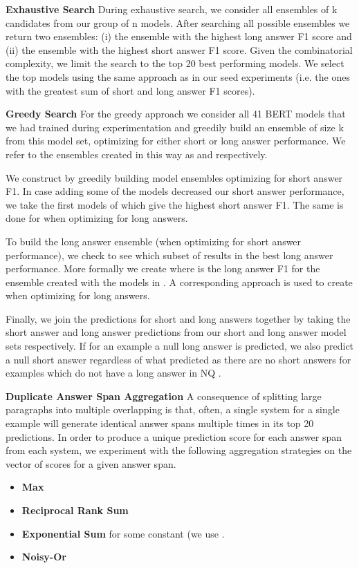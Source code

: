 \documentclass[letterpaper]{article} \usepackage{aaai20}  \usepackage{times}  \usepackage{helvet} \usepackage{courier}  \usepackage[hyphens]{url}  \usepackage{graphicx} \urlstyle{rm} \def\UrlFont{\rm}  \usepackage{graphicx}  \frenchspacing  \setlength{\pdfpagewidth}{8.5in}  \setlength{\pdfpageheight}{11in}  \usepackage{amsmath}
\newcommand{\bertlarge}{BERT}
\begin{document}
\textbf{Exhaustive Search}
During exhaustive search, we consider all  ensembles of k candidates from our group of n models. After searching all possible ensembles we return two ensembles: (i) the ensemble with the highest long answer F1 score and (ii) the ensemble with the highest short answer F1 score. Given the combinatorial complexity, we limit the search to the top 20 best performing models.  We select the top models using the same approach as in our seed experiments (i.e. the ones with the greatest sum of short and long answer F1 scores).

\textbf{Greedy Search} For the greedy approach we consider all 41 \bertlarge{} models that we had trained during experimentation and greedily build an ensemble of size k from this model set, optimizing for either short or long answer performance.  We refer to the ensembles created in this way as  and  respectively.

We construct  by greedily building  model ensembles optimizing for short answer F1.  In case adding some of the models decreased our short answer performance, we take the first  models of  which give the highest short answer F1.  The same is done for  when optimizing for long answers.

To build the long answer ensemble (when optimizing for short answer performance), we check to see which subset of  results in the best long answer performance.  More formally we create  where  is the long answer F1 for the ensemble created with the models in .  A corresponding approach is used to create  when optimizing for long answers.

Finally, we join the predictions for short and long answers together by taking the short answer and long answer predictions from our short and long answer model sets respectively.  If for an example a null long answer is predicted, we also predict a null short answer regardless of what  predicted as there are no short answers for examples which do not have a long answer in NQ \cite{Kwiatkowski2019NaturalQA}.

\textbf{Duplicate Answer Span Aggregation} A consequence of splitting large paragraphs into multiple overlapping is that, often, a single system for a single example will generate identical answer spans multiple times in its top 20 predictions. 
In order to produce a unique prediction score for each answer span from each system, we experiment with the following aggregation strategies on the vector  of scores for a given answer span. 
\begin{itemize}
    \item \textbf{Max} 
    \item \textbf{Reciprocal Rank Sum} 
    \item \textbf{Exponential Sum}  for some constant  (we use .
    \item \textbf{Noisy-Or} 
\end{itemize}{}
\end{document}
